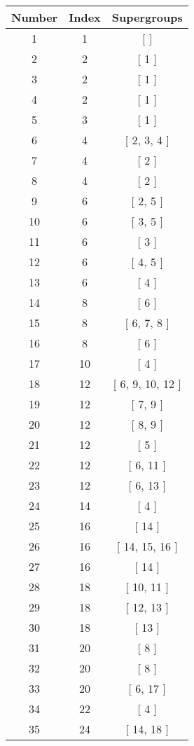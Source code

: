 \begin{center}
\begin{longtable}[H]{|| c c c ||}
\hline
Number & Index & Supergroups \\ 
\hline
1 & 1 & [ ] \\ 
\hline
2 & 2 & [ 1 ] \\ 
\hline
3 & 2 & [ 1 ] \\ 
\hline
4 & 2 & [ 1 ] \\ 
\hline
5 & 3 & [ 1 ] \\ 
\hline
6 & 4 & [ 2, 3, 4 ] \\ 
\hline
7 & 4 & [ 2 ] \\ 
\hline
8 & 4 & [ 2 ] \\ 
\hline
9 & 6 & [ 2, 5 ] \\ 
\hline
10 & 6 & [ 3, 5 ] \\ 
\hline
11 & 6 & [ 3 ] \\ 
\hline
12 & 6 & [ 4, 5 ] \\ 
\hline
13 & 6 & [ 4 ] \\ 
\hline
14 & 8 & [ 6 ] \\ 
\hline
15 & 8 & [ 6, 7, 8 ] \\ 
\hline
16 & 8 & [ 6 ] \\ 
\hline
17 & 10 & [ 4 ] \\ 
\hline
18 & 12 & [ 6, 9, 10, 12 ] \\ 
\hline
19 & 12 & [ 7, 9 ] \\ 
\hline
20 & 12 & [ 8, 9 ] \\ 
\hline
21 & 12 & [ 5 ] \\ 
\hline
22 & 12 & [ 6, 11 ] \\ 
\hline
23 & 12 & [ 6, 13 ] \\ 
\hline
24 & 14 & [ 4 ] \\ 
\hline
25 & 16 & [ 14 ] \\ 
\hline
26 & 16 & [ 14, 15, 16 ] \\ 
\hline
27 & 16 & [ 14 ] \\ 
\hline
28 & 18 & [ 10, 11 ] \\ 
\hline
29 & 18 & [ 12, 13 ] \\ 
\hline
30 & 18 & [ 13 ] \\ 
\hline
31 & 20 & [ 8 ] \\ 
\hline
32 & 20 & [ 8 ] \\ 
\hline
33 & 20 & [ 6, 17 ] \\ 
\hline
34 & 22 & [ 4 ] \\ 
\hline
35 & 24 & [ 14, 18 ] \\ 

\end{longtable}
\end{center}
